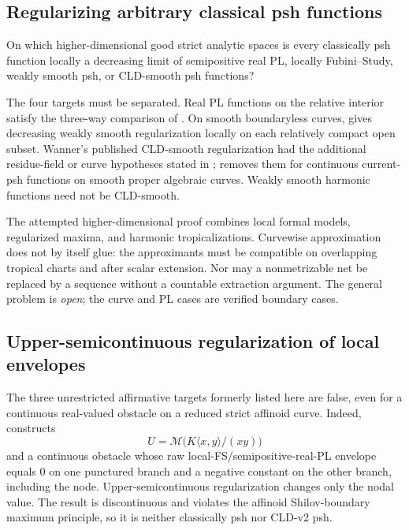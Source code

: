 \subsection{Regularizing arbitrary classical psh functions}

\begin{problem}\label{prob:frontier-classical-regularization}
On which higher-dimensional good strict analytic spaces is every classically
psh function locally a decreasing limit of semipositive real PL, locally
Fubini--Study, weakly smooth psh, or CLD-smooth psh functions?
\end{problem}

The four targets must be separated.  Real PL functions on the relative
interior satisfy the three-way comparison of
.  On smooth boundaryless curves,
\cite[Proposition~15.11]{GJR26} gives decreasing weakly smooth
regularization locally on each relatively compact open subset.  Wanner's
published CLD-smooth regularization had the additional residue-field or curve
hypotheses stated in \cite[Corollary~5.4]{Wanner19};
 removes them for
continuous current-psh functions on smooth proper algebraic curves.
Weakly smooth harmonic functions need not be CLD-smooth.

The attempted higher-dimensional proof combines local formal models,
regularized maxima, and harmonic tropicalizations.  Curvewise approximation
does not by itself glue: the approximants must be compatible on overlapping
tropical charts and after scalar extension.  Nor may a nonmetrizable net be
replaced by a sequence without a countable extraction argument.  The general
problem is \emph{open}; the curve and PL cases are verified boundary cases.

\subsection{Upper-semicontinuous regularization of local envelopes}

The three unrestricted affirmative targets formerly listed here are false,
even for a continuous real-valued obstacle on a reduced strict affinoid curve.
Indeed,  constructs
\[
 U=\mathcal M\bigl(K\langle x,y\rangle/(xy)\bigr)
\]
and a continuous obstacle whose raw local-FS/semipositive-real-PL envelope
equals \(0\) on one punctured branch and a negative constant on the other
branch, including the node.  Upper-semicontinuous regularization changes only
the nodal value.  The result is discontinuous and violates the affinoid
Shilov-boundary maximum principle, so it is neither classically psh nor
CLD-v2 psh.

